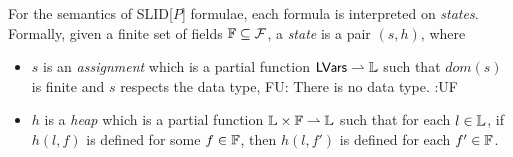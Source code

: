 \documentclass{llncs}
\newcommand{\tl}[1]{\color{blue} {TL: #1 :LT} \color{black}}
\newcommand{\fu}[1]{\color{purple} {FU: #1 :UF} \color{black}}
\begin{document}
For the semantics of SLID[$P$] formulae, each formula is interpreted on \emph{states}. Formally, given a finite set of fields $\mathbb{F} \subseteq \mathcal{F}$, a \emph{state} is a pair $(s,h)$, where
\vspace{-2mm}
\begin{itemize}

\item $s$ is an \emph{assignment}  which is a partial function $\mathsf{LVars} \rightharpoonup {\mathbb L} $ such that $dom(s)$ is finite and $s$ respects the data type,
\fu{There is no data type.}



\item $h$ is a \emph{heap} which is a partial function ${\mathbb L} \times \mathbb{F} \rightharpoonup {\mathbb L}$  such that for each $l  \in {\mathbb L}$, if $h(l,f)$ is defined for some $f \in \mathbb{F}$, then $h(l,f')$ is defined for each $f' \in \mathbb{F}$.

\end{itemize}
\end{document}
